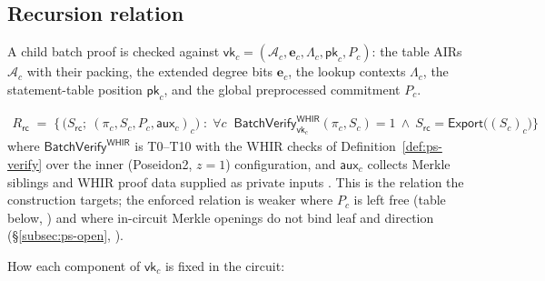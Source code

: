 \subsection{Recursion relation}
\label{subsec:ps-recursion}

\begin{definition}
\label{def:ps-vk}
A child batch proof is checked against
$\mathsf{vk}_c = (\mathcal{A}_c, \mathbf{e}_c, \Lambda_c, \mathsf{pk}_c, P_c)$:
the table AIRs $\mathcal{A}_c$ with their packing, the extended degree bits
$\mathbf{e}_c$, the lookup contexts $\Lambda_c$, the statement-table position
$\mathsf{pk}_c$, and the global preprocessed commitment $P_c$.
\end{definition}

\begin{definition}
\label{def:ps-rrc}
\mbox{}\par\nobreak
\begin{align}
  R_{\mathsf{rc}} \;=\; \Big\{\, \big(S_{\mathsf{rc}};\ (\pi_c, S_c, P_c, \mathsf{aux}_c)_c\big) \;:\;
  \forall c\;\; \mathsf{BatchVerify}^{\mathsf{WHIR}}_{\mathsf{vk}_c}(\pi_c, S_c) = 1
  \ \wedge\ S_{\mathsf{rc}} = \mathsf{Export}\big((S_c)_c\big) \Big\}
\end{align}
where $\mathsf{BatchVerify}^{\mathsf{WHIR}}$ is T0--T10 with the WHIR checks of
Definition~\ref{def:ps-verify} over the inner (Poseidon2, $z=1$) configuration,
and $\mathsf{aux}_c$ collects Merkle siblings and WHIR proof data supplied as
private inputs .
This is the relation the construction targets; the enforced relation is weaker
where $P_c$ is left free (table below, ) and where in-circuit
Merkle openings do not bind leaf and direction (\S\ref{subsec:ps-open},
).
\end{definition}

How each component of $\mathsf{vk}_c$ is fixed in the circuit:

